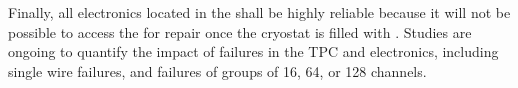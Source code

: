 Finally, all electronics located in the \lar shall %
be highly reliable because it will not be possible to access the  for repair once the cryostat is filled with \lar. Studies are ongoing to quantify the impact of failures in the TPC and electronics, including single wire failures, and failures of groups of \num{16}, \num{64}, or \num{128} channels.




